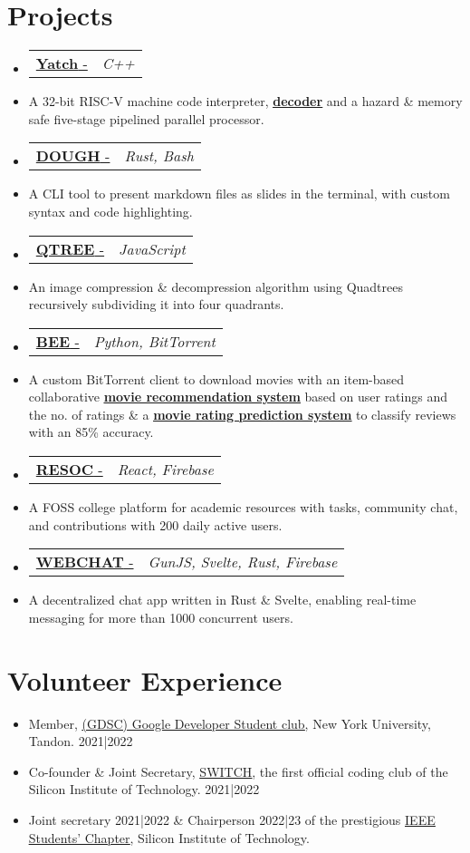 \documentclass[letterpaper,10pt]{article}
\makeatletter
\newcommand{\resumeItem}[1]{
  \item\small{
    {#1 \vspace{-2pt}}
  }
}
\newcommand{\resumeProjectHeading}[2]{
    \item
    \begin{tabular*}{0.97\textwidth}{l@{\extracolsep{\fill}}r}
      \small#1 & \textit{\small #2} \\
    \end{tabular*}\vspace{-4 pt}
}
\newcommand{\resumeSubItem}[1]{\resumeItem{#1}\vspace{-4pt}}
\newcommand{\resumeSubHeadingListStart}{\begin{itemize}[leftmargin=0.15in, label={}]}
\newcommand{\resumeSubHeadingListEnd}{\end{itemize}}
\makeatother
\begin{document}


\section{Projects}
  \resumeSubHeadingListStart
\resumeProjectHeading
  {\href{https://github.com/fuzzymfx/yatch}{\textbf{Yatch} - \faIcon{link}}}{C++}
    \resumeSubItem
      {A 32-bit RISC-V machine code interpreter, {\href{https://anubhavp.dev/barney}{\underline{\textbf{decoder}}}} and a hazard \& memory safe five-stage pipelined parallel processor.}
  \resumeProjectHeading
    {\href{https://github.com/fuzzymfx/dough}{\textbf{DOUGH} - \faIcon{link}}}{Rust, Bash}
    \resumeSubItem
      {A CLI tool to present markdown files as slides in the terminal, with custom syntax and code highlighting.}
  \resumeProjectHeading
    {\href{https://anubhavp.dev/blog/qtree.html}{\textbf{QTREE} - \faIcon{link}}}{JavaScript}
    \resumeSubItem
      {An image compression \& decompression algorithm using Quadtrees recursively subdividing it into four quadrants. }
  \resumeProjectHeading
    {\href{https://github.com/fuzzymfx/b}{{\textbf{BEE} - \faIcon{link} }}}{Python, BitTorrent}
    \resumeSubItem
      {A custom BitTorrent client to download movies with an item-based collaborative \href{https://github.com/fuzzymfx/Movie-recommendation}{\underline{\textbf{ movie recommendation system}}} based on user ratings and the no. of ratings \& a \href{https://github.com/fuzzymfx/Movie-rating-prediction}{\underline{\textbf{movie rating prediction system}}} to classify reviews with an 85\% accuracy.}
  \resumeProjectHeading
    {\href{https://github.com/fuzzymfx/resoc}{\textbf{RESOC} - \faIcon{link} }}{React, Firebase}
    \resumeSubItem
      {A FOSS college platform for academic resources with tasks, community chat, and contributions with 200 daily active users.}
    \resumeProjectHeading
    {\href{https://github.com/fuzzymfx/w3bchat-dapp}{\textbf{WEBCHAT} - \faIcon{link}}}{GunJS, Svelte, Rust, Firebase}
    \resumeSubItem
      {A decentralized chat app written in Rust \& Svelte, enabling real-time messaging for more than 1000 concurrent users.}
  \resumeSubHeadingListEnd

%

\section{Volunteer Experience}
  \resumeSubHeadingListStart
  \resumeSubItem
      {Member, \href{https://www.linkedin.com/company/gdsc-nyu-tandon/}{\underline{(GDSC) Google Developer Student club}}, New York University, Tandon.  2021|2022}
    \resumeSubItem
      {Co-founder \& Joint Secretary, \href{https://www.linkedin.com/company/switch-sit/}{\underline{SWITCH}}, the first official coding club of the Silicon Institute of Technology. 2021|2022}
    \resumeSubItem
      {Joint secretary 2021|2022 \& Chairperson 2022|23 of the prestigious \href{https://www.instagram.com/ieeesitbbsr/}{\underline{IEEE Students’ Chapter}}, Silicon Institute of Technology.}
  \resumeSubHeadingListEnd

\end{document}
